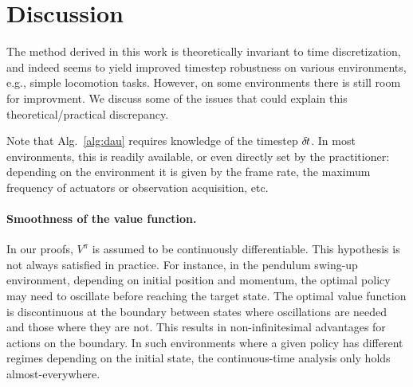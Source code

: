 \section{Discussion}
\label{sec:discussions}

The method derived in this work is theoretically invariant to time
discretization, and
indeed seems to yield improved timestep robustness
on various environments, e.g.,
simple locomotion tasks.  However, on some environments there is still
room for improvment. We discuss some of the issues
that could explain this theoretical/practical discrepancy.

Note that Alg.~\ref{alg:dau} requires
knowledge of the timestep ${\delta\hspace{-.1em}t}$. In most environments, this is
readily available, or even directly set by the practitioner: depending on
the environment it is given by the frame rate, the maximum frequency of
actuators or observation acquisition, etc. 

\paragraph{Smoothness of the value function.} In our proofs, $V^\pi$ is
assumed to be continuously differentiable.  This %
hypothesis is not always satisfied in practice. 
For instance, in the pendulum swing-up environment, depending on initial
position and momentum, the optimal policy may need to oscillate before
reaching the target state. The optimal value
function is discontinuous at the boundary between states where
oscillations are needed and those where they are not.
This results in non-infinitesimal advantages
for actions on the boundary. In such environments where a given policy
has different regimes depending on the initial state, the continuous-time
analysis only holds almost-everywhere.

